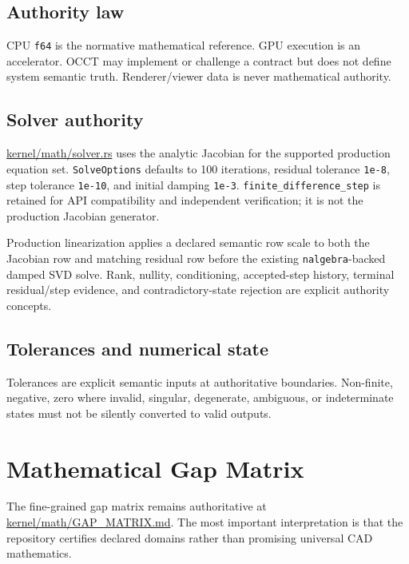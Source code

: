 \documentclass[11pt,a4paper]{report}
\newcommand{\pathref}[1]{\url{#1}}
\begin{document}
\section{Authority law}
CPU \texttt{f64} is the normative mathematical reference. GPU execution is an accelerator. OCCT may implement or challenge a contract but does not define system semantic truth. Renderer/viewer data is never mathematical authority.

\section{Solver authority}
\pathref{kernel/math/solver.rs} uses the analytic Jacobian for the supported production equation set. \texttt{SolveOptions} defaults to 100 iterations, residual tolerance \texttt{1e-8}, step tolerance \texttt{1e-10}, and initial damping \texttt{1e-3}. \texttt{finite\_difference\_step} is retained for API compatibility and independent verification; it is not the production Jacobian generator.

Production linearization applies a declared semantic row scale to both the Jacobian row and matching residual row before the existing \texttt{nalgebra}-backed damped SVD solve. Rank, nullity, conditioning, accepted-step history, terminal residual/step evidence, and contradictory-state rejection are explicit authority concepts.

\section{Tolerances and numerical state}
Tolerances are explicit semantic inputs at authoritative boundaries. Non-finite, negative, zero where invalid, singular, degenerate, ambiguous, or indeterminate states must not be silently converted to valid outputs.

\chapter{Mathematical Gap Matrix}

The fine-grained gap matrix remains authoritative at \pathref{kernel/math/GAP_MATRIX.md}. The most important interpretation is that the repository certifies declared domains rather than promising universal CAD mathematics.
\end{document}
